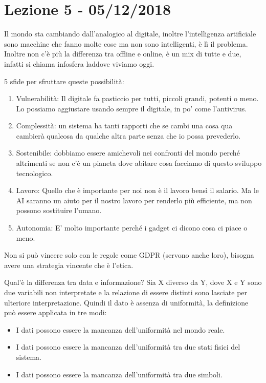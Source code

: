 \documentclass[a4page, 11pt]{article}
\begin{document}
\section*{Lezione 5 - 05/12/2018}

Il mondo sta cambiando dall'analogico al digitale, inoltre
l'intelligenza artificiale sono macchine che fanno molte cose ma non
sono intelligenti, è lì il problema. Inoltre non c'è più la differenza
tra offline e online, è un mix di tutte e due, infatti si chiama
infosfera laddove viviamo oggi.

5 sfide per sfruttare queste possibilità:

\begin{enumerate}
	\def\labelenumi{\arabic{enumi})}
	 
	\item
	Vulnerabilità: Il digitale fa pasticcio per tutti, piccoli grandi,
	potenti o meno. Lo possiamo aggiustare usando sempre il digitale, in
	po' come l'antivirus.
	\item
	Complessità: un sistema ha tanti rapporti che se cambi una cosa qua
	cambierà qualcosa da qualche altra parte senza che io possa
	prevederlo. 
	\item
	Sostenibile: dobbiamo essere amichevoli nei confronti del mondo perché
	altrimenti se non c'è un pianeta dove abitare cosa facciamo di questo
	sviluppo tecnologico. 
	\item
	Lavoro: Quello che è importante per noi non è il lavoro bensì il
	salario. Ma le AI saranno un aiuto per il nostro lavoro per renderlo
	più efficiente, ma non possono sostituire l'umano.
	\item
	Autonomia: E' molto importante perché i gadget ci dicono cosa ci piace
	o meno.
\end{enumerate}

Non si può vincere solo con le regole come GDPR (servono anche loro),
bisogna avere una strategia vincente che è l'etica.

Qual'è la differenza tra data e informazione? Sia X diverso da Y, dove X
e Y sono due variabili non interpretate e la relazione di essere
distinti sono lasciate per ulteriore interpretazione. Quindi il dato è
assenza di uniformità, la definizione può essere applicata in tre modi:

\begin{itemize}
	 
	\item
	I dati possono essere la mancanza dell'uniformità nel mondo reale.
	\item
	I dati possono essere la mancanza dell'uniformità tra due stati fisici
	del sistema.
	\item
	I dati possono essere la mancanza dell'uniformità tra due simboli.
\end{itemize}
\end{document}
